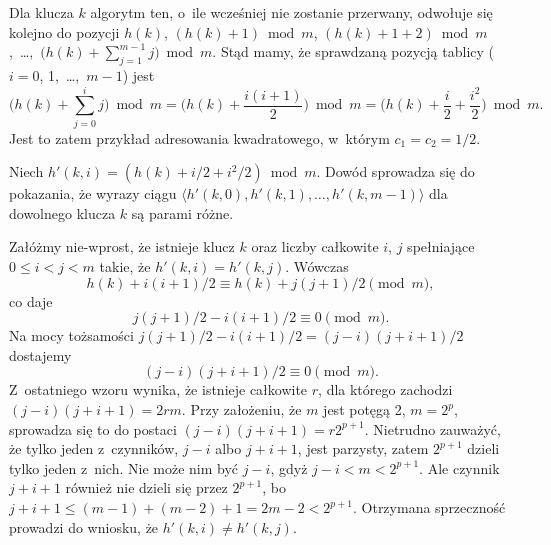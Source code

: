 
\subproblem %
Dla klucza $k$ algorytm ten, o~ile wcześniej nie zostanie przerwany, odwołuje się kolejno do pozycji $h(k)$, $(h(k)+1)\bmod m$, $(h(k)+1+2)\bmod m$,~\dots,~$\bigl(h(k)+\sum_{j=1}^{m-1}j\bigr)\bmod m$. Stąd mamy, że  sprawdzaną pozycją tablicy ($i=0$, 1,~\dots,~$m-1$) jest
\[
	\biggl(h(k)+\sum_{j=0}^ij\biggr)\bmod m = \biggl(h(k)+\frac{i(i+1)}{2}\biggr)\bmod m = \biggl(h(k)+\frac{i}{2}+\frac{i^2}{2}\biggr)\bmod m.
\]
Jest to zatem przykład adresowania kwadratowego, w~którym $c_1=c_2=1/2$.

\subproblem %
Niech $h'(k,i)=(h(k)+i/2+i^2\!/2)\bmod m$. Dowód sprowadza się do pokazania, że wyrazy ciągu $\langle h'(k,0),h'(k,1),\dots,h'(k,m-1)\rangle$ dla dowolnego klucza $k$ są parami różne.

Załóżmy nie-wprost, że istnieje klucz $k$ oraz liczby całkowite $i$, $j$ spełniające $0\le i<j<m$ takie, że $h'(k,i)=h'(k,j)$. Wówczas
\[
	h(k)+i(i+1)/2 \equiv h(k)+j(j+1)/2 \pmod m,
\]
co daje
\[
	j(j+1)/2-i(i+1)/2 \equiv 0 \pmod m.
\]
Na mocy tożsamości $j(j+1)/2-i(i+1)/2=(j-i)(j+i+1)/2$ dostajemy
\[
	(j-i)(j+i+1)/2 \equiv 0 \pmod m.
\]
Z~ostatniego wzoru wynika, że istnieje całkowite $r$, dla którego zachodzi $(j-i)(j+i+1)=2rm$. Przy założeniu, że $m$ jest potęgą 2, $m=2^p$, sprowadza się to do postaci $(j-i)(j+i+1)=r2^{p+1}$. Nietrudno zauważyć, że tylko jeden z~czynników, $j-i$ albo $j+i+1$, jest parzysty, zatem $2^{p+1}$ dzieli tylko jeden z~nich. Nie może nim być $j-i$, gdyż $j-i<m<2^{p+1}$. Ale czynnik $j+i+1$ również nie dzieli się przez $2^{p+1}$, bo $j+i+1\le(m-1)+(m-2)+1=2m-2<2^{p+1}$. Otrzymana sprzeczność prowadzi do wniosku, że $h'(k,i)\ne h'(k,j)$.


